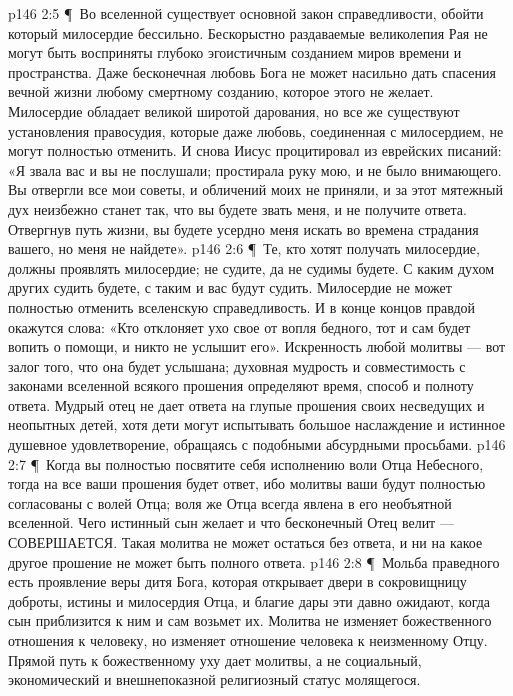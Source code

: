 \vs p146 2:5 \P\ \bibnobreakspace Во вселенной существует основной закон справедливости, обойти который милосердие бессильно. Бескорыстно раздаваемые великолепия Рая не могут быть восприняты глубоко эгоистичным созданием миров времени и пространства. Даже бесконечная любовь Бога не может насильно дать спасения вечной жизни любому смертному созданию, которое этого не желает. Милосердие обладает великой широтой дарования, но все же существуют установления правосудия, которые даже любовь, соединенная с милосердием, не могут полностью отменить. И снова Иисус процитировал из еврейских писаний: «Я звала вас и вы не послушали; простирала руку мою, и не было внимающего. Вы отвергли все мои советы, и обличений моих не приняли, и за этот мятежный дух неизбежно станет так, что вы будете звать меня, и не получите ответа. Отвергнув путь жизни, вы будете усердно меня искать во времена страдания вашего, но меня не найдете».
\vs p146 2:6 \P\ \bibnobreakspace Те, кто хотят получать милосердие, должны проявлять милосердие; не судите, да не судимы будете. С каким духом других судить будете, с таким и вас будут судить. Милосердие не может полностью отменить вселенскую справедливость. И в конце концов правдой окажутся слова: «Кто отклоняет ухо свое от вопля бедного, тот и сам будет вопить о помощи, и никто не услышит его». Искренность любой молитвы --- вот залог того, что она будет услышана; духовная мудрость и совместимость с законами вселенной всякого прошения определяют время, способ и полноту ответа. Мудрый отец не дает  ответа на глупые прошения своих несведущих и неопытных детей, хотя дети могут испытывать большое наслаждение и истинное душевное удовлетворение, обращаясь с подобными абсурдными просьбами.
\vs p146 2:7 \P\ \bibnobreakspace Когда вы полностью посвятите себя исполнению воли Отца Небесного, тогда на все ваши прошения будет ответ, ибо молитвы ваши будут полностью согласованы с волей Отца; воля же Отца всегда явлена в его необъятной вселенной. Чего истинный сын желает и что бесконечный Отец велит --- СОВЕРШАЕТСЯ. Такая молитва не может остаться без ответа, и ни на какое другое прошение не может быть полного ответа.
\vs p146 2:8 \P\ \bibnobreakspace Мольба праведного есть проявление веры дитя Бога, которая открывает двери в сокровищницу доброты, истины и милосердия Отца, и благие дары эти давно ожидают, когда сын приблизится к ним и сам возьмет их. Молитва не изменяет божественного отношения к человеку, но изменяет отношение человека к неизменному Отцу. Прямой путь к божественному уху дает  молитвы, а не социальный, экономический и внешнепоказной религиозный статус молящегося.
